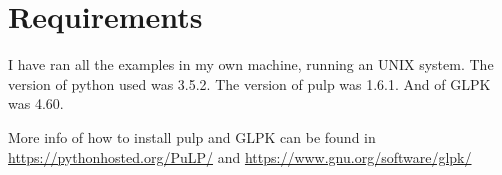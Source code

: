 \documentclass[11pt,a4paper,twocolumn]{article}
\begin{document}
\section*{Requirements}
I have ran all the examples in my own machine, running an UNIX system. The 
version of python used was 3.5.2. The version of pulp was 1.6.1. And of GLPK was 
4.60.

More info of how to install pulp and GLPK can be found in 
\url{https://pythonhosted.org/PuLP/} and 
\url{https://www.gnu.org/software/glpk/}
\end{document}
